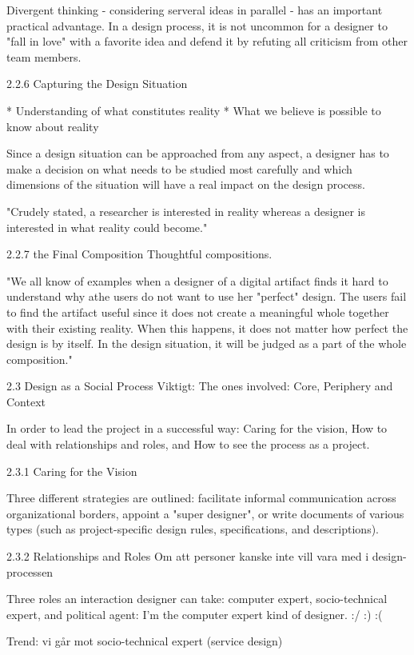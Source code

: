 Divergent thinking - considering serveral ideas in parallel - has an important practical advantage. In a design process, it is not uncommon for a designer to "fall in love" with a favorite idea and defend it by refuting all criticism from other team members.

2.2.6 Capturing the Design Situation

* Understanding of what constitutes reality
* What we believe is possible to know about reality

Since a design situation can be approached from any aspect, a designer has to make a decision on what needs to be studied most carefully and which dimensions of the situation will have a real impact on the design process.

"Crudely stated, a researcher is interested in reality whereas a designer is interested in what reality could become."

2.2.7 the Final Composition
Thoughtful compositions.

"We all know of examples when a designer of a digital artifact finds it hard to understand why athe users do not want to use her "perfect" design. The users fail to find the artifact useful since it does not create a meaningful whole together with their existing reality. When this happens, it does not matter how perfect the design is by itself. In the design situation, it will be judged as a part of the whole composition."

2.3 Design as a Social Process
Viktigt: The ones involved: Core, Periphery and Context

In order to lead the project in a successful way: Caring for the vision, How to deal with relationships and roles, and How to see the process as a project.

2.3.1 Caring for the Vision

Three different strategies are outlined: facilitate informal communication across organizational borders, appoint a "super designer", or write documents of various types (such as project-specific design rules, specifications, and descriptions). %

2.3.2 Relationships and Roles
Om att personer kanske inte vill vara med i design-processen

Three roles an interaction designer can take: computer expert, socio-technical expert, and political agent:
I'm the computer expert kind of designer. :/ :) :(

Trend: vi går mot socio-technical expert (service design)

